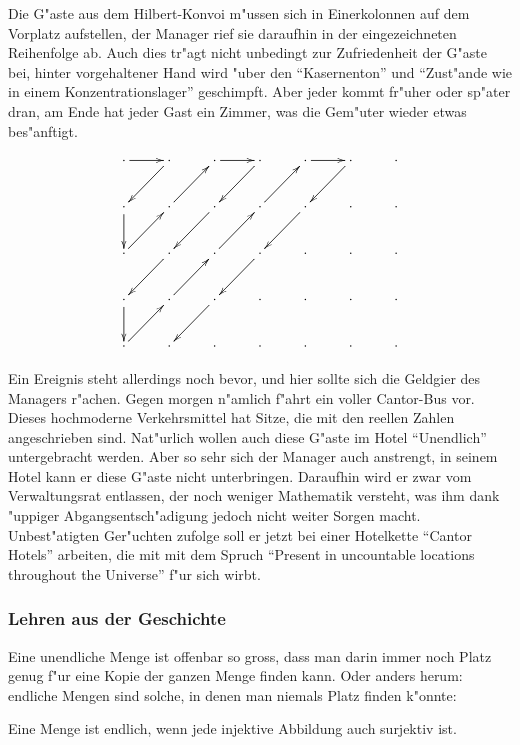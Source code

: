 Die G"aste aus dem Hilbert-Konvoi m"ussen sich in Einerkolonnen auf
dem Vorplatz aufstellen, der Manager rief sie daraufhin in der
eingezeichneten Reihenfolge ab. Auch dies tr"agt nicht  unbedingt
zur Zufriedenheit der G"aste bei, hinter vorgehaltener Hand wird
"uber den ``Kasernenton'' und ``Zust"ande wie in einem Konzentrationslager''
geschimpft.
Aber jeder kommt fr"uher oder sp"ater dran,
am Ende hat jeder Gast ein Zimmer, was die Gem"uter wieder
etwas bes"anftigt.

\[
\xymatrix{
\ar[r]
\cdot	     &\cdot\ar[dl] &\cdot\ar[r] &\cdot\ar[dl]  &\cdot\ar[r] &\cdot\ar[dl] &\cdot
\\
\cdot\ar[d]  &\cdot\ar[ur] &\cdot\ar[dl] &\cdot\ar[ur] &\cdot\ar[dl]&\cdot        &\cdot
\\
\cdot\ar[ur] &\cdot\ar[dl] &\cdot\ar[ur] &\cdot\ar[dl] &\cdot       &\cdot        &\cdot
\\
\cdot\ar[d]  &\cdot\ar[ur] &\cdot\ar[dl] &\cdot        &\cdot       &\cdot        &\cdot
\\
\cdot\ar[ur] &\cdot        &\cdot        &\cdot        &\cdot       &\cdot        &\cdot
}
\]

Ein Ereignis steht allerdings noch bevor, und hier sollte sich die
Geldgier des Managers r"achen. Gegen morgen n"amlich f"ahrt
ein voller Cantor-Bus vor. Dieses hochmoderne Verkehrsmittel hat Sitze,
die mit den reellen Zahlen angeschrieben sind. Nat"urlich wollen auch
diese G"aste im Hotel ``Unendlich'' untergebracht werden. Aber so sehr
sich der Manager auch anstrengt, in seinem Hotel kann er diese
G"aste nicht unterbringen. Daraufhin wird er zwar vom Verwaltungsrat
entlassen, der noch weniger Mathematik versteht, was ihm dank "uppiger
Abgangsentsch"adigung jedoch nicht weiter Sorgen macht. Unbest"atigten
Ger"uchten zufolge soll er jetzt bei einer Hotelkette ``Cantor Hotels''
arbeiten, die mit mit dem Spruch ``Present in uncountable locations
throughout the Universe'' f"ur sich wirbt.

\subsubsection{Lehren aus der Geschichte}
Eine unendliche Menge ist offenbar so gross, dass man darin immer noch
Platz genug f"ur eine Kopie der ganzen Menge finden kann. Oder anders
herum: endliche Mengen sind solche, in denen man niemals Platz finden
k"onnte:

\begin{satz}
Eine Menge ist endlich, wenn jede injektive Abbildung auch surjektiv ist.
\end{satz}


